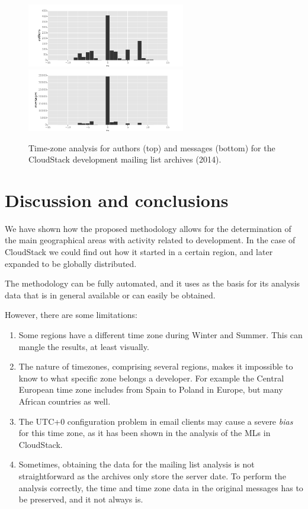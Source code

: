 \documentclass{sig-alternate-05-2015}
\begin{document}
\begin{figure}[!h]
\centering
\includegraphics[width=6.9cm]{figs/cloudstack/tz-mls-authors-2014.pdf}
\includegraphics[width=6.9cm]{figs/cloudstack/tz-mls-messages-2014.pdf}
\caption{Time-zone analysis for authors (top) and messages (bottom) for
the CloudStack development mailing list archives (2014).}
\label{fig:2014-mls}
\end{figure}


\section{Discussion and conclusions}
\label{sec:discussion}

We have shown how the proposed methodology allows for the determination of the main geographical areas with activity related to development. In the case of CloudStack we could find out how it started in a certain region, and later expanded to 
be globally distributed.

The methodology can be fully automated, and it uses as the basis for its analysis data that is in general available or can easily be obtained.

However, there are some limitations:

\begin{enumerate}

  \item Some regions have a different time zone during Winter and Summer. This can mangle the results, at least visually.

  \item The nature of timezones, comprising several regions, makes it impossible to know to what specific zone belongs a developer. For example the Central European time zone includes from Spain to Poland in Europe, but many African countries as well.

  \item The UTC+0 configuration problem in email clients may cause a severe 
\emph{bias} for this time zone, as it has been shown in the analysis of the
MLs in CloudStack.

  \item Sometimes, obtaining the data for the mailing
list analysis is not straightforward as the archives only store the server
date. To perform the analysis correctly, the time and time zone data in the original messages has to be preserved, and it not always is.

\end{enumerate}
\end{document}
